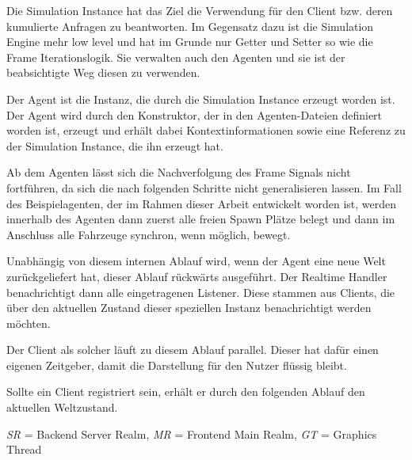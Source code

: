 \begin{itemize}
     Die Simulation Instance hat das Ziel die Verwendung für den Client bzw.
    deren kumulierte Anfragen zu beantworten.
    Im Gegensatz dazu ist die Simulation Engine mehr low level und hat im Grunde nur Getter und Setter so wie die Frame Iterationslogik.
    Sie verwalten auch den Agenten und sie ist der beabsichtigte Weg diesen zu verwenden.

     Der Agent ist die Instanz, die durch die Simulation Instance erzeugt worden ist.
    Der Agent wird durch den Konstruktor, der in den Agenten-Dateien definiert worden ist, erzeugt und erhält dabei Kontextinformationen sowie eine Referenz zu der Simulation Instance, die ihn erzeugt hat.
\end{itemize}

Ab dem Agenten lässt sich die Nachverfolgung des Frame Signals nicht fortführen, da sich die nach folgenden Schritte nicht generalisieren lassen.
Im Fall des Beispielagenten, der im Rahmen dieser Arbeit entwickelt worden ist, werden innerhalb des Agenten dann zuerst alle freien Spawn Plätze belegt und dann im Anschluss alle Fahrzeuge synchron, wenn möglich, bewegt.

Unabhängig von diesem internen Ablauf wird, wenn der Agent eine neue Welt zurückgeliefert hat, dieser Ablauf rückwärts ausgeführt.
Der Realtime Handler benachrichtigt dann alle eingetragenen Listener.
Diese stammen aus Clients, die über den aktuellen Zustand dieser speziellen Instanz benachrichtigt werden möchten.

Der Client als solcher läuft zu diesem Ablauf parallel.
Dieser hat dafür einen eigenen Zeitgeber, damit die Darstellung für den Nutzer flüssig bleibt.

Sollte ein Client registriert sein, erhält er durch den folgenden Ablauf den aktuellen Weltzustand.

\textit{SR} = Backend Server Realm, \textit{MR} = Frontend Main Realm, \textit{GT} = Graphics Thread


